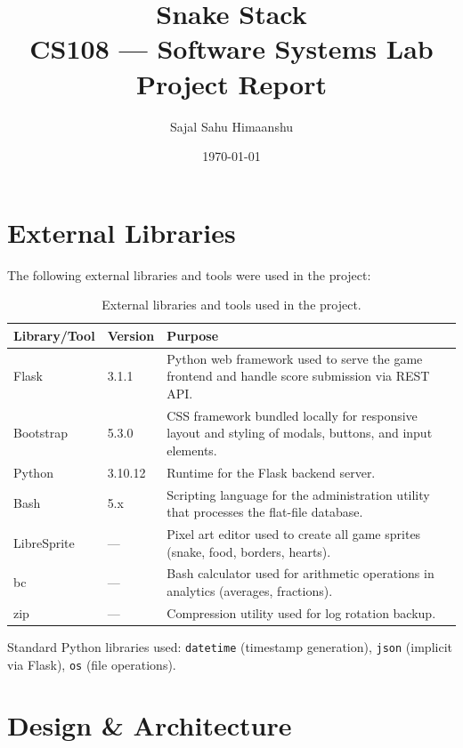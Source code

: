 \documentclass[12pt,a4paper]{article}
\title{\textbf{Snake Stack}\\CS108 --- Software Systems Lab\\Project Report}
\author{Sajal Sahu \quad Himaanshu}
\date{\today}
\begin{document}
\maketitle
\tableofcontents
\newpage

\section{External Libraries}

The following external libraries and tools were used in the project:

\begin{table}[h!]
\centering
\begin{tabular}{@{}lll@{}}
\toprule
\textbf{Library/Tool} & \textbf{Version} & \textbf{Purpose} \\
\midrule
Flask       & 3.1.1   & Python web framework used to serve the game frontend and handle score submission via REST API. \\
Bootstrap   & 5.3.0   & CSS framework bundled locally for responsive layout and styling of modals, buttons, and input elements. \\
Python      & 3.10.12 & Runtime for the Flask backend server. \\
Bash        & 5.x     & Scripting language for the administration utility that processes the flat-file database. \\
LibreSprite & ---     & Pixel art editor used to create all game sprites (snake, food, borders, hearts). \\
bc          & ---     & Bash calculator used for arithmetic operations in analytics (averages, fractions). \\
zip         & ---     & Compression utility used for log rotation backup. \\
\bottomrule
\end{tabular}
\caption{External libraries and tools used in the project.}
\end{table}

Standard Python libraries used: \texttt{datetime} (timestamp generation), \texttt{json} (implicit via Flask), \texttt{os} (file operations).

\section{Design \& Architecture}
\end{document}
